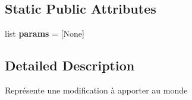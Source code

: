 \subsection*{\-Static \-Public \-Attributes}
\begin{DoxyCompactItemize}
\item 
\hypertarget{classsrc_1_1orders_1_1_order_aa15ac874941c1dd31e60be3ba4a89e91}{list {\bfseries params} = \mbox{[}\-None\mbox{]}}\label{classsrc_1_1orders_1_1_order_aa15ac874941c1dd31e60be3ba4a89e91}

\end{DoxyCompactItemize}


\subsection{\-Detailed \-Description}
\begin{DoxyVerb}Représente une modification à apporter au monde \end{DoxyVerb}
 

